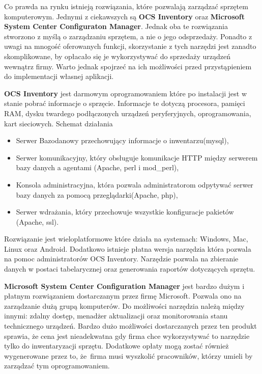 Co prawda na rynku istnieją rozwiązania, które pozwalają zarządzać sprzętem komputerowym. Jednymi z ciekawszych są \textbf{OCS Inventory} oraz \textbf{Microsoft System Center Configuraton Manager}. Jednak oba te rozwiązania stworzono z myślą o zarządzaniu sprzętem, a nie o jego odsprzedaży. Ponadto z uwagi na mnogość oferowanych funkcji, skorzystanie z tych narzędzi jest zanadto skomplikowane, by opłacało się je wykorzystywać do sprzedaży urządzeń wewnątrz firmy. Warto jednak spojrzeć na ich możliwości przed przystąpieniem do implementacji własnej aplikacji.

\textbf{OCS Inventory} jest darmowym oprogramowaniem które po instalacji jest w stanie pobrać informacje o sprzęcie. Informacje te dotyczą procesora, pamięci RAM, dysku twardego podłączonych urządzeń peryferyjnych, oprogramowania, kart sieciowych.
\newline
Schemat działania
\begin{itemize}
	\item Serwer Bazodanowy przechowujący informacje o inwentarzu(mysql),
	\item Serwer komunikacyjny, który obsługuje komunikacje HTTP między serwerem bazy danych a agentami (Apache, perl i mod\_perl),
	\item Konsola administracyjna, która pozwala administratorom odpytywać serwer bazy danych za pomocą przeglądarki(Apache, php),
	\item Serwer wdrażania, który przechowuje wszystkie konfiguracje pakietów (Apache, ssl).
\end{itemize}
Rozwiązanie jest wieloplatformowe które działa na systemach: Windows, Mac, Linux oraz Android. Dodatkowo istnieje płatna wersja narzędzia która pozwala na pomoc administratorów OCS Inventory. Narzędzie pozwala na zbieranie danych w postaci tabelarycznej oraz generowania raportów dotyczących sprzętu. 

\textbf{Microsoft System Center Configuration Manager} jest bardzo dużym i płatnym rozwiązaniem dostarczanym przez firmę Microsoft. Pozwala ono na zarządzanie dużą grupą komputerów. Do możliwości narzędzia należą między innymi: zdalny dostęp, menadżer aktualizacji oraz monitorowania stanu technicznego urządzeń. Bardzo dużo możliwości dostarczanych przez ten produkt sprawia, że cena jest nieadekwatna gdy firma chce wykorzystywać to narzędzie tylko do inwentaryzacji sprzętu. Dodatkowe opłaty mogą zostać również wygenerowane przez to, że~firma musi wyszkolić pracowników, którzy umieli by zarządzać tym oprogramowaniem.


